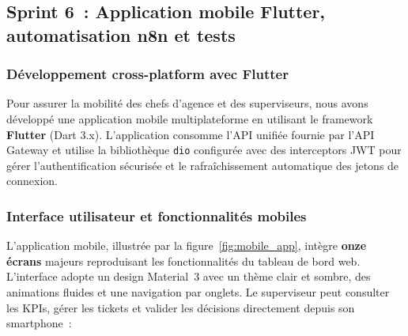\subsection{Sprint 6~: Application mobile Flutter, automatisation n8n et tests}

\subsubsection{D\'{e}veloppement cross-platform avec Flutter}

Pour assurer la mobilit\'{e} des chefs d'agence et des superviseurs, nous avons d\'{e}velopp\'{e} une application mobile multiplateforme en utilisant le framework \textbf{Flutter} (Dart 3.x). L'application consomme l'API unifi\'{e}e fournie par l'API Gateway et utilise la biblioth\`{e}que \texttt{dio} configur\'{e}e avec des interceptors JWT pour g\'{e}rer l'authentification s\'{e}curis\'{e}e et le rafra\^{i}chissement automatique des jetons de connexion.

\subsubsection{Interface utilisateur et fonctionnalit\'{e}s mobiles}

L'application mobile, illustr\'{e}e par la figure~\ref{fig:mobile_app}, int\`{e}gre \textbf{onze \'{e}crans} majeurs reproduisant les fonctionnalit\'{e}s du tableau de bord web. L'interface adopte un design Material~3 avec un th\`{e}me clair et sombre, des animations fluides et une navigation par onglets. Le superviseur peut consulter les KPIs, g\'{e}rer les tickets et valider les d\'{e}cisions directement depuis son smartphone~:

